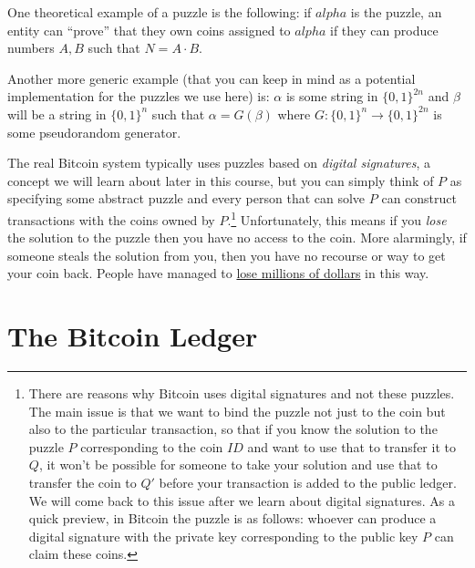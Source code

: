 
One theoretical example of a puzzle is the following: if \(alpha\) is
the puzzle, an entity can ``prove'' that they own coins assigned to
\(alpha\) if they can produce numbers \(A,B\) such that \(N=A\cdot B\).

Another more generic example (that you can keep in mind as a potential
implementation for the puzzles we use here) is: \(\alpha\) is some
string in \(\{0,1\}^{2n}\) and \(\beta\) will be a string in
\(\{0,1\}^n\) such that \(\alpha = G(\beta)\) where
\(G:\{0,1\}^n\rightarrow\{0,1\}^{2n}\) is some pseudorandom generator.

The real Bitcoin system typically uses puzzles based on \emph{digital
signatures}, a concept we will learn about later in this course, but you
can simply think of \(P\) as specifying some abstract puzzle and every
person that can solve \(P\) can construct transactions with the coins
owned by \(P\).\footnote{There are reasons why Bitcoin uses digital
  signatures and not these puzzles. The main issue is that we want to
  bind the puzzle not just to the coin but also to the particular
  transaction, so that if you know the solution to the puzzle \(P\)
  corresponding to the coin \(\ensuremath{\mathit{ID}}\) and want to use
  that to transfer it to \(Q\), it won't be possible for someone to take
  your solution and use that to transfer the coin to \(Q'\) before your
  transaction is added to the public ledger. We will come back to this
  issue after we learn about digital signatures. As a quick preview, in
  Bitcoin the puzzle is as follows: whoever can produce a digital
  signature with the private key corresponding to the public key \(P\)
  can claim these coins.} Unfortunately, this means if you \emph{lose}
the solution to the puzzle then you have no access to the coin. More
alarmingly, if someone steals the solution from you, then you have no
recourse or way to get your coin back. People have managed to
\href{http://readwrite.com/2014/01/13/what-happens-to-lost-Bitcoins}{lose
millions of dollars} in this way.

\section{The Bitcoin Ledger}\label{7-The-Bitcoin-Ledger}


